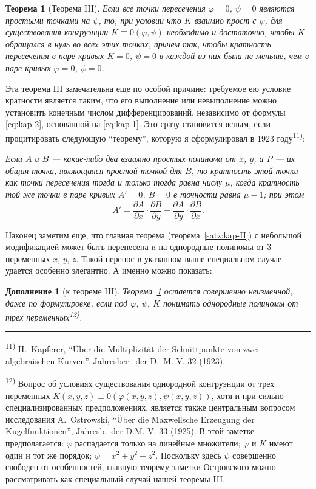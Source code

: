 \documentclass[11pt]{article}
\newcommand{\foreign}[1]{#1}
\theoremstyle{plain}
\newtheorem{satz}{Теорема}
\newtheorem{zusatz}{Дополнение}
\begin{document}
\begin{satz}[Теорема III]\label{satz:kap-III}
Если все точки пересечения $\varphi = 0$, $\psi = 0$ являются
простыми точками на $\psi$, то, при условии что $K$ взаимно прост с
$\psi$, для существования конгруэнции $K \equiv 0(\varphi, \psi)$
необходимо и достаточно, чтобы $K$ обращался в нуль во всех этих
точках, причем так, чтобы кратность пересечения в паре кривых
$K = 0$, $\psi = 0$ в каждой из них была не меньше, чем в паре
кривых $\varphi = 0$, $\psi = 0$.
\end{satz}

Эта теорема III замечательна еще по особой причине: требуемое ею
условие кратности является таким, что его выполнение или невыполнение
можно установить конечным числом дифференцирований, независимо от
формулы \eqref{eq:kap-2}, основанной на \eqref{eq:kap-1}. Это сразу
становится ясным, если процитировать следующую ``теорему'', которую
я сформулировал в 1923 году\textsuperscript{11)}:

\smallskip
\textit{Если $A$ и $B$ --- какие-либо два взаимно простых полинома
от $x$, $y$, а $P$ --- их общая точка, являющаяся простой точкой для
$B$, то кратность этой точки как точки пересечения тогда и только
тогда равна числу $\mu$, когда кратность той же точки в паре кривых
$A' = 0$, $B = 0$ в точности равна $\mu - 1$; при этом}
\[
A' = \frac{\partial A}{\partial x} \cdot \frac{\partial B}{\partial y} -
\frac{\partial A}{\partial y} \cdot \frac{\partial B}{\partial x}.
\]

Наконец заметим еще, что главная теорема
(теорема~\ref{satz:kap-II}) с небольшой модификацией может быть
перенесена и на однородные полиномы от 3 переменных $x$, $y$, $z$.
Такой перенос в указанном выше специальном случае удается особенно
элегантно. А именно можно показать:

\begin{zusatz}[к теореме III]
Теорема~\ref{satz:kap-III} остается совершенно неизменной, даже по
формулировке, если под $\varphi$, $\psi$, $K$ понимать однородные
полиномы от трех переменных\textsuperscript{12)}.
\end{zusatz}

\vspace{0.5em}
\noindent\rule{\textwidth}{0.4pt}
\vspace{0.3em}

{\footnotesize
\textsuperscript{11)} H.\ Kapferer, ``Über die Multiplizität der Schnittpunkte von zwei algebraischen
Kurven''. \foreign{Jahresber.\ der D.\ M.-V.} 32 (1923).

\textsuperscript{12)} Вопрос об условиях существования однородной конгруэнции
от трех переменных
$K(x,y,z) \equiv 0(\varphi(x,y,z), \psi(x,y,z))$, хотя и при сильно
специализированных предположениях, является также центральным
вопросом исследования A.\ Ostrowski, ``Über die Maxwellsche Erzeugung der
Kugelfunktionen'', \foreign{Jahresb.\ der D.M.-V.} 33 (1925). В этой
заметке предполагается: $\varphi$ распадается только на линейные
множители; $\varphi$ и $K$ имеют один и тот же порядок;
$\psi = x^{2} + y^{2} + z^{2}$. Поскольку здесь $\psi$ совершенно
свободен от особенностей, главную теорему заметки Островского можно
рассматривать как специальный случай нашей теоремы III.
}
\end{document}
